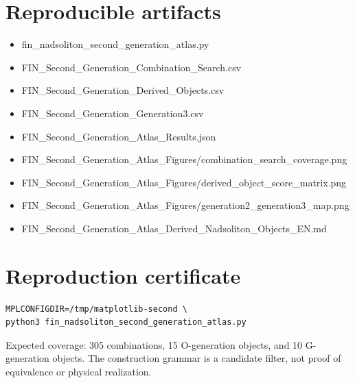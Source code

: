 \documentclass[11pt,a4paper,openany]{report}
\begin{document}
\chapter{Reproducible artifacts}

\begin{itemize}
\item 
fin\_nadsoliton\_second\_generation\_atlas.py

\item 
FIN\_Second\_Generation\_Combination\_Search.csv

\item 
FIN\_Second\_Generation\_Derived\_Objects.csv

\item 
FIN\_Second\_Generation\_Generation3.csv

\item 
FIN\_Second\_Generation\_Atlas\_Results.json

\item 
FIN\_Second\_Generation\_Atlas\_Figures/\allowbreak{}combination\_search\_coverage.png

\item 
FIN\_Second\_Generation\_Atlas\_Figures/\allowbreak{}derived\_object\_score\_matrix.png

\item 
FIN\_Second\_Generation\_Atlas\_Figures/\allowbreak{}generation2\_generation3\_map.png

\item 
FIN\_Second\_Generation\_Atlas\_Derived\_Nadsoliton\_Objects\_EN.md

\end{itemize}


\clearpage
\chapter*{Reproduction certificate}
\begin{Verbatim}[fontsize=\small]
MPLCONFIGDIR=/tmp/matplotlib-second \
python3 fin_nadsoliton_second_generation_atlas.py
\end{Verbatim}
Expected coverage: 305 combinations, 15 O-generation objects, and 10
G-generation objects. The construction grammar is a candidate filter, not
proof of equivalence or physical realization.
\end{document}
